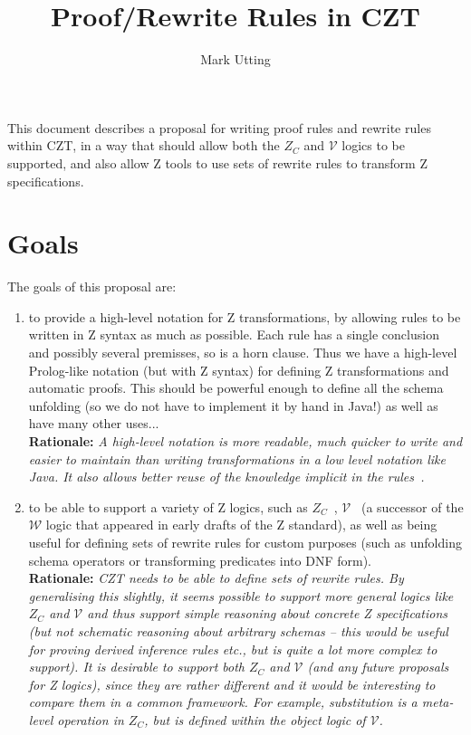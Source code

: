 \documentclass{article}
\title{Proof/Rewrite Rules in CZT}
\author{Mark Utting}
\newenvironment{Rationale}{\\ \textbf{Rationale:}\it}{}
\newcommand{\V}{\mathcal{V}}
\begin{document}
\maketitle

This document describes a proposal for writing proof rules
and rewrite rules within CZT, in a way that should allow both
the $Z_C$ and $\V$ logics to be supported, and also
allow Z tools to use sets of rewrite rules to transform Z 
specifications. 

\section{Goals}

The goals of this proposal are:
\begin{enumerate}
\item to provide a high-level notation for Z transformations,
  by allowing rules to be written in Z syntax as much as possible.
  Each rule has a single conclusion and possibly several premisses,
  so is a horn clause.  Thus we have a high-level Prolog-like notation
  (but with Z syntax) for defining Z transformations and automatic proofs.
  This should be powerful enough to define all the schema
  unfolding  (so we do not have to implement
  it by hand in Java!) as well as have many other uses...
  \begin{Rationale}
    A high-level notation is more readable, much quicker
    to write and easier to maintain than writing transformations in
    a low level notation like Java.  It also allows better reuse of the
    knowledge implicit in the rules~\cite{DenningACM}.
  \end{Rationale}

\item to be able to support a variety of Z logics, such as
  $Z_C$~\cite{henson:revising-z-1-99,henson:revising-z-2-99}, 
  $\mathcal{V}$~\cite{brien:calculus-schemas-z00} (a successor of
  the $\mathcal{W}$ logic that appeared in early drafts of the Z standard),
  as well as being useful for defining sets of rewrite rules
  for custom purposes (such as unfolding schema operators
  or transforming predicates into DNF form).
  \begin{Rationale}
    CZT needs to be able to define sets of rewrite rules.
    By generalising this slightly, it seems possible to support more
    general logics like $Z_C$ and $\mathcal{V}$ and thus support simple
    reasoning about concrete Z specifications (but not schematic
    reasoning about arbitrary schemas -- this would be useful for proving
    derived inference rules etc., but is quite a lot more complex
    to support).  It is desirable to 
    support both $Z_C$ and $\mathcal{V}$ (and any future proposals for Z
    logics), since they are rather different and it would be interesting
    to compare them in a common framework.  For example, substitution
    is a meta-level operation in $Z_C$, but is defined within the object
    logic of $\mathcal{V}$.
  \end{Rationale}


\end{enumerate}
\end{document}
